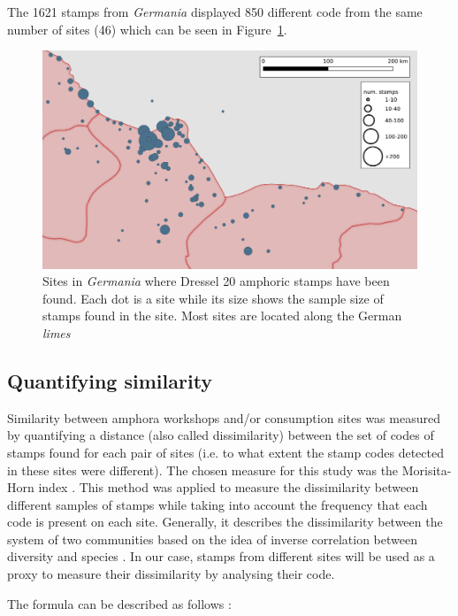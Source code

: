 The 1621 stamps from \textit{Germania} displayed 850 different code from the same number of sites (46) which can be seen in Figure~\ref{germania}.

\begin{figure}[htp]
	\centering
\includegraphics[width=\linewidth]{germania}
\caption{Sites in \textit{Germania} where Dressel 20 amphoric stamps have been found. Each dot is a site while its size shows the sample size of stamps found in the site. Most sites are located along the German \textit{limes}}
\label{germania}
\end{figure}

\subsection{Quantifying similarity}
\label{sec:5}

Similarity between amphora workshops and/or consumption sites was measured by quantifying a distance (also called dissimilarity) between the set of codes of stamps found for each pair of sites (i.e. to what extent the stamp codes detected in these sites were different). The chosen measure for this study was the Morisita-Horn index \citep{morisita_measuring_1959, horn_measurement_1966}. This method was applied to measure the dissimilarity between different samples of stamps while taking into account the frequency that each code is present on each site. Generally, it describes the dissimilarity between the system of two communities based on the idea of inverse correlation between diversity and species \citep{magurran_why_1988}. In our case, stamps from different sites will be used as a proxy to measure their dissimilarity by analysing their code. 

The formula can be described as follows \citep{magurran_measuring_2013}:

